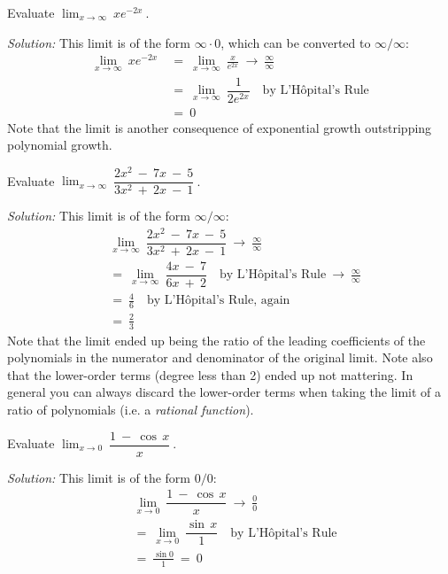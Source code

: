 \begin{exmp}\label{exmp:limzeroinf}
\noindent Evaluate $\displaystyle\lim_{x \to \infty}~x e^{-2x}~$.\vspace{1mm}
\par\noindent\emph{Solution:} This limit is of the form $\infty \cdot 0$, which
can be converted to $\infty/\infty$:
\begin{align*}
\lim_{x \to \infty}~x e^{-2x} ~&=~ \lim_{x \to \infty}~\frac{x}{e^{2x}} ~\to~ \frac{\infty}{\infty}\\
&=~ \lim_{x \to \infty}~\dfrac{1}{2e^{2x}} \quad\text{by L'H\^{o}pital's Rule}\\
&=~ 0
\end{align*}
Note that the limit is another consequence of exponential growth outstripping
polynomial growth.
\end{exmp}
\begin{exmp}\label{exmp:limratpoly}
\noindent Evaluate $\displaystyle\lim_{x \to \infty}~\dfrac{2x^2 ~-~ 7x ~-~ 5}{3x^2 ~+~ 2x ~-~ 1}~$.\vspace{1mm}
\par\noindent\emph{Solution:} This limit is of the form $\infty/\infty$:
\begin{align*}
&\lim_{x \to \infty}~\dfrac{2x^2 ~-~ 7x ~-~ 5}{3x^2 ~+~ 2x ~-~ 1} ~\to~ \frac{\infty}{\infty}\\[4pt]
&=~ \lim_{x \to \infty}~\dfrac{4x ~-~ 7}{6x ~+~ 2} \quad\text{by L'H\^{o}pital's Rule}
~\to~ \frac{\infty}{\infty} \\[6pt]
&=~ \frac{4}{6} \quad\text{by L'H\^{o}pital's Rule, again}\\
&=~ \frac{2}{3}
\end{align*}
Note that the limit ended up being the ratio of the leading coefficients of the
polynomials in the numerator and denominator of the original limit. Note also
that the lower-order terms (degree less than 2) ended up not mattering. In
general you can always discard the lower-order terms when taking the limit of a
ratio of polynomials (i.e. a
\emph{rational function}).
\end{exmp}
\divider
\newpage
\begin{exmp}\label{exmp:lim1minuscos}
\noindent Evaluate $\displaystyle\lim_{x \to 0}~\dfrac{1 ~-~ \cos\,x}{x}~$.\vspace{1mm}
\par\noindent\emph{Solution:} This limit is of the form $0/0$:
\begin{align*}
&\lim_{x \to 0}~\dfrac{1 ~-~ \cos\,x}{x} ~\to~ \frac{0}{0}\\[4pt]
&=~ \lim_{x \to 0}~\dfrac{\sin\,x}{1} \quad\text{by L'H\^{o}pital's Rule}\\[6pt]
&=~ \frac{\sin 0}{1} ~=~ 0
\end{align*}
\end{exmp}
\divider
\vspace{3mm}

